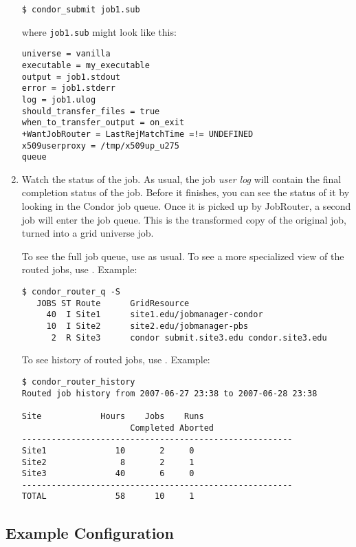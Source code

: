 \begin{enumerate}
\begin{verbatim}
$ condor_submit job1.sub
\end{verbatim}

where \verb|job1.sub| might look like this:

\begin{verbatim}
universe = vanilla
executable = my_executable
output = job1.stdout
error = job1.stderr
log = job1.ulog
should_transfer_files = true
when_to_transfer_output = on_exit
+WantJobRouter = LastRejMatchTime =!= UNDEFINED
x509userproxy = /tmp/x509up_u275
queue
\end{verbatim}

\item Watch the status of the job.  As usual, the job \textit{user log} will
contain the final completion status of the job.  Before it finishes,
you can see the status of it by looking in the Condor job queue.  Once
it is picked up by JobRouter, a second job will enter the job queue.
This is the transformed copy of the original job, turned into a grid
universe job.

To see the full job queue, use  as usual.  To
see a more specialized view of the routed jobs, use
.  Example:

\begin{verbatim}
$ condor_router_q -S
   JOBS ST Route      GridResource
     40  I Site1      site1.edu/jobmanager-condor
     10  I Site2      site2.edu/jobmanager-pbs
      2  R Site3      condor submit.site3.edu condor.site3.edu
\end{verbatim}

To see history of routed jobs, use .  Example:

\begin{verbatim}
$ condor_router_history
Routed job history from 2007-06-27 23:38 to 2007-06-28 23:38

Site            Hours    Jobs    Runs
                      Completed Aborted
-------------------------------------------------------
Site1              10       2     0
Site2               8       2     1
Site3              40       6     0
-------------------------------------------------------
TOTAL              58      10     1
\end{verbatim}

\end{enumerate}


\subsection{Example Configuration}\label{ExampleJobRouterConfiguration}

